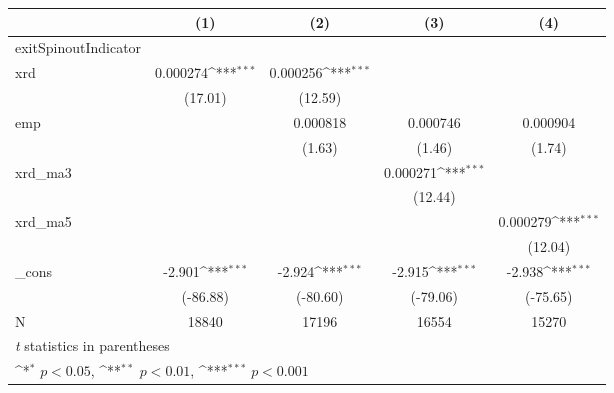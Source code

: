 {
\def\sym#1{\ifmmode^{#1}\else\(^{#1}\)\fi}
\begin{tabular}{l*{4}{c}}
\hline\hline
            &\multicolumn{1}{c}{(1)}         &\multicolumn{1}{c}{(2)}         &\multicolumn{1}{c}{(3)}         &\multicolumn{1}{c}{(4)}         \\
\hline
exitSpinoutIndicator&                     &                     &                     &                     \\
xrd         &    0.000274\sym{***}&    0.000256\sym{***}&                     &                     \\
            &     (17.01)         &     (12.59)         &                     &                     \\
[1em]
emp         &                     &    0.000818         &    0.000746         &    0.000904         \\
            &                     &      (1.63)         &      (1.46)         &      (1.74)         \\
[1em]
xrd\_ma3     &                     &                     &    0.000271\sym{***}&                     \\
            &                     &                     &     (12.44)         &                     \\
[1em]
xrd\_ma5     &                     &                     &                     &    0.000279\sym{***}\\
            &                     &                     &                     &     (12.04)         \\
[1em]
\_cons      &      -2.901\sym{***}&      -2.924\sym{***}&      -2.915\sym{***}&      -2.938\sym{***}\\
            &    (-86.88)         &    (-80.60)         &    (-79.06)         &    (-75.65)         \\
\hline
N           &       18840         &       17196         &       16554         &       15270         \\
\hline\hline
\multicolumn{5}{l}{\footnotesize \textit{t} statistics in parentheses}\\
\multicolumn{5}{l}{\footnotesize \sym{*} \(p<0.05\), \sym{**} \(p<0.01\), \sym{***} \(p<0.001\)}\\
\end{tabular}
}
